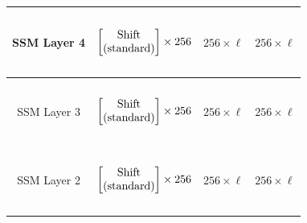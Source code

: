 \begin{table}[]
\begin{tabular}{@{}c|c|c|c@{}}
SSM Layer 4 & \begin{math}\begin{aligned}    \begin{matrix}    \text{\phantom{-}} \\    \end{matrix}    \\    \begin{bmatrix}    \text{\phantom{-} Shift \phantom{-}}  \\ \text{(standard)} \\    \end{bmatrix}    \times 256     \\    \begin{matrix}    \text{\phantom{-}} \\    \end{matrix}    \\\end{aligned}\end{math}              & $256 \times \ell$ & $256 \times \ell$ \\ \midrule
SSM Layer 3 & \begin{math}\begin{aligned}    \begin{matrix}    \text{\phantom{-}} \\    \end{matrix}    \\    \begin{bmatrix}    \text{\phantom{-} Shift \phantom{-}}  \\ \text{(standard)} \\    \end{bmatrix}    \times 256     \\    \begin{matrix}    \text{\phantom{-}} \\    \end{matrix}    \\\end{aligned}\end{math}              & $256 \times \ell$ & $256 \times \ell$ \\ \midrule
SSM Layer 2 & \begin{math}\begin{aligned}    \begin{matrix}    \text{\phantom{-}} \\    \end{matrix}    \\    \begin{bmatrix}    \text{\phantom{-} Shift \phantom{-}} \\ \text{(standard)} \\    \end{bmatrix}    \times 256     \\    \begin{matrix}    \text{\phantom{-}} \\    \end{matrix}    \\\end{aligned}\end{math}              & $256 \times \ell$ & $256 \times \ell$ \\ \midrule

\end{tabular}
\end{table}
